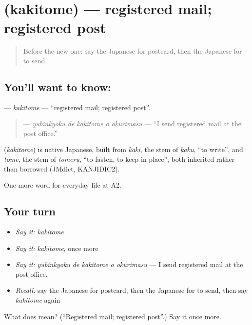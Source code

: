 \section[\texorpdfstring{\ja{かきとめ} (kakitome)}{かきとめ (kakitome)}]{ (kakitome) — registered mail; registered post}

\label{lesson:JA-C188-kakitome}



\begin{quote}
Before the new one: say the Japanese for postcard, then the Japanese for to send.
\end{quote}

\subsection*{You'll want to know: }
\textbf{} — \emph{kakitome} — \textquotedblleft{}registered mail; registered post\textquotedblright{}.

\begin{quote}
\textbf{  } — \emph{yūbinkyoku de kakitome o okurimasu} — \textquotedblleft{}I send registered mail at the post office.\textquotedblright{}
\end{quote}

\begin{cousinweb}
\textbf{} (\emph{kakitome}) is native Japanese, built from \emph{kaki}, the stem of \emph{kaku}, \textquotedblleft{}to write\textquotedblright{}, and \emph{tome}, the stem of \emph{tomeru}, \textquotedblleft{}to fasten, to keep in place\textquotedblright{}, both inherited rather than borrowed (JMdict, KANJIDIC2).
\end{cousinweb}

\begin{grammarlens}[title={What you've built}]
One more word for everyday life at A2.
\end{grammarlens}

\subsection*{Your turn}
\begin{itemize}
\raggedright
  \item \emph{Say it:} \emph{kakitome}
  \item \emph{Say it:} \emph{kakitome}, once more
  \item \emph{Say it:} \emph{yūbinkyoku de kakitome o okurimasu} — I send registered mail at the post office.
  \item \emph{Recall:} say the Japanese for postcard, then the Japanese for to send, then say \emph{kakitome} again
\end{itemize}

\begin{tcolorbox}[breakable,colback=teal!4,colframe=teal!35!black,title={Before you move on}]
What does  mean? (\textquotedblleft{}Registered mail; registered post\textquotedblright{}.) Say it once more.
\end{tcolorbox}
